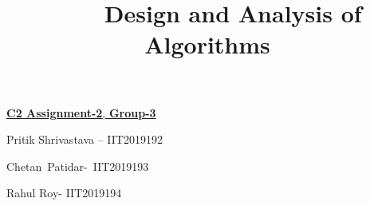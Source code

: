 \documentclass[10pt]{report}
\title{\ \ \ \  Design and Analysis of Algorithms}
\date{}
\begin{document}
\maketitle
\par

{\fontsize{15pt}{18.0pt}\selectfont \textbf{\uline{C2 Assignment-2}}\uline{, \textbf{Group-3}}\par}\par


\vspace{\baselineskip}
Pritik Shrivastava – IIT2019192\par

Chetan\ Patidar-\ IIT2019193\ \ \ \ \ \ \ \    \par

Rahul Roy- IIT2019194\par

\ \  \ \ \ \ \ \ \ \ \ \ \ \ \ \ \ \ \ \ \  \tab \ \ \ \ \ \ \ \ \  \tab \ \ \ \ \  \tab \ \ \ \ \  \par
\end{document}

